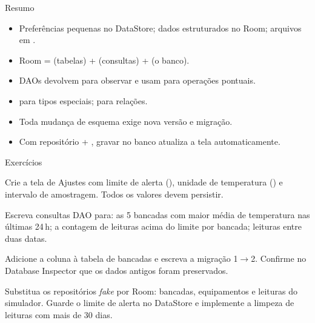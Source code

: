 \documentclass[aspectratio=169,10pt]{beamer}
\begin{document}
\begin{frame}{Resumo}
  \begin{resumo}
    \begin{itemize}
      \item Preferências pequenas no DataStore; dados estruturados no Room; arquivos em .
      \item Room =  (tabelas) +  (consultas) +  (o banco).
      \item DAOs devolvem  para observar e usam  para operações pontuais.
      \item {} para tipos especiais;  para relações.
      \item Toda mudança de esquema exige nova versão e migração.
      \item Com repositório + , gravar no banco atualiza a tela automaticamente.
    \end{itemize}
  \end{resumo}
\end{frame}

\begin{frame}{Exercícios}
  \begin{exercicio}
    Crie a tela de Ajustes com limite de alerta (), unidade de temperatura () e intervalo de amostragem. Todos os valores devem persistir.
  \end{exercicio}
  \begin{exercicio}
    Escreva consultas DAO para: as 5 bancadas com maior média de temperatura nas últimas 24\,h; a contagem de leituras acima do limite por bancada; leituras entre duas datas.
  \end{exercicio}
  \begin{exercicio}
    Adicione a coluna  à tabela de bancadas e escreva a migração 1$\rightarrow$2. Confirme no Database Inspector que os dados antigos foram preservados.
  \end{exercicio}
  \begin{projeto}
    Substitua os repositórios \emph{fake} por Room: bancadas, equipamentos e leituras do simulador. Guarde o limite de alerta no DataStore e implemente a limpeza de leituras com mais de 30 dias.
  \end{projeto}
\end{frame}
\end{document}
